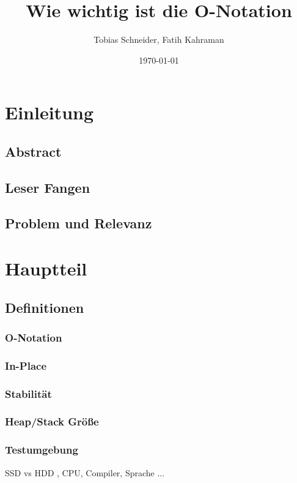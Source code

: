 \documentclass{article}
\title{Wie wichtig ist die O-Notation}
\author{Tobias Schneider, Fatih Kahraman}
\date{\today}
\begin{document}
\maketitle %

\newpage{}

\tableofcontents{}%
\newpage{}


\section{Einleitung}
\subsection{Abstract}
\subsection{Leser Fangen}
\subsection{Problem und Relevanz}

\section{Hauptteil}
\subsection{Definitionen}
\subsubsection{O-Notation}
\subsubsection{In-Place}
\subsubsection{Stabilität}
\subsubsection{Heap/Stack Größe}
\subsubsection{Testumgebung}
SSD vs HDD , CPU, Compiler, Sprache ...
\end{document}
